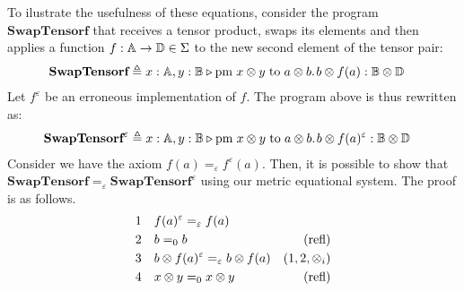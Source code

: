 \begin{example} \label{ex:metric_eqs}
  To ilustrate the usefulness of these equations, consider the program $\textbf{SwapTensorf}$ that receives a tensor product, swaps its elements and then applies a function $f: \mathbb{A} \to \mathbb{D} \in \Sigma $ to the new second element of the tensor pair:
\begin{equation*}
\begin{split}
& \textbf{SwapTensorf} \triangleq x : \mathbb{A},  y : \mathbb{B} \triangleright \text{pm} \hspace{3 pt} x \otimes y\hspace{3 pt} \text{to} \hspace{3 pt} a \otimes b. \hspace{1pt} b \otimes f(a) : \mathbb{B} \otimes \mathbb{D} &
\end{split}
\end{equation*}
Let $ f^{\varepsilon} $ be an erroneous implementation of $ f $. The program above is thus rewritten as:
\begin{equation*}
  \begin{split}
  & \textbf{SwapTensorf}^{\varepsilon} \triangleq  x : \mathbb{A},  y : \mathbb{B} \triangleright \text{pm} \hspace{3 pt} x \otimes y\hspace{3 pt} \text{to} \hspace{3 pt} a \otimes b. \hspace{1pt} b \otimes f(a)^{\varepsilon}  : \mathbb{B} \otimes \mathbb{D} &
  \end{split}
  \end{equation*}
Consider we  have the axiom $f(a) =_{\varepsilon} f^{\varepsilon}(a)$. Then, it is possible to show that $\textbf{SwapTensorf} =_{\varepsilon} \textbf{SwapTensorf}^{\varepsilon} $ using our metric equational system. The proof is as follows. %
\begin{equation*}
  \begin{split}
  1 \hspace{10 pt} & f(a)^{\varepsilon} =_{\varepsilon} f(a) \\
  2 \hspace{10 pt} &  b =_{0} b & {(\text{refl})} \\
  3 \hspace{10 pt} & b \otimes f(a)^{\varepsilon}  =_{\varepsilon} b \otimes f(a)  & \text{($1,2,\otimes_i$)} \\
  4 \hspace{10 pt} &   x \otimes y =_{0}  x \otimes y  &{(\text{refl})}  \\

\end{split}
\end{equation*}
\end{example}
